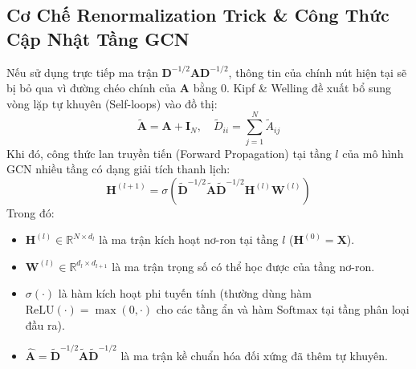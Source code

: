 \documentclass[12pt,a4paper]{report}
\begin{document}
\subsection{Cơ Chế Renormalization Trick \& Công Thức Cập Nhật Tầng GCN}
Nếu sử dụng trực tiếp ma trận $\mathbf{D}^{-1/2} \mathbf{A} \mathbf{D}^{-1/2}$, thông tin của chính nút hiện tại sẽ bị bỏ qua vì đường chéo chính của $\mathbf{A}$ bằng 0. Kipf \& Welling đề xuất bổ sung vòng lặp tự khuyên (Self-loops) vào đồ thị:
\begin{equation}
    \tilde{\mathbf{A}} = \mathbf{A} + \mathbf{I}_N, \quad \tilde{D}_{ii} = \sum_{j=1}^N \tilde{A}_{ij}
\end{equation}
Khi đó, công thức lan truyền tiến (Forward Propagation) tại tầng $l$ của mô hình GCN nhiều tầng có dạng giải tích thanh lịch:
\begin{equation}
    \mathbf{H}^{(l+1)} = \sigma \left( \tilde{\mathbf{D}}^{-1/2} \tilde{\mathbf{A}} \tilde{\mathbf{D}}^{-1/2} \mathbf{H}^{(l)} \mathbf{W}^{(l)} \right)
    \label{eq:gcn_layer}
\end{equation}
Trong đó:
\begin{itemize}[leftmargin=1.2cm]
    \item $\mathbf{H}^{(l)} \in \mathbb{R}^{N \times d_l}$ là ma trận kích hoạt nơ-ron tại tầng $l$ ($\mathbf{H}^{(0)} = \mathbf{X}$).
    \item $\mathbf{W}^{(l)} \in \mathbb{R}^{d_l \times d_{l+1}}$ là ma trận trọng số có thể học được của tầng nơ-ron.
    \item $\sigma(\cdot)$ là hàm kích hoạt phi tuyến tính (thường dùng hàm $\text{ReLU}(\cdot) = \max(0, \cdot)$ cho các tầng ẩn và hàm $\text{Softmax}$ tại tầng phân loại đầu ra).
    \item $\hat{\mathbf{A}} = \tilde{\mathbf{D}}^{-1/2} \tilde{\mathbf{A}} \tilde{\mathbf{D}}^{-1/2}$ là ma trận kề chuẩn hóa đối xứng đã thêm tự khuyên.
\end{itemize}
\end{document}
